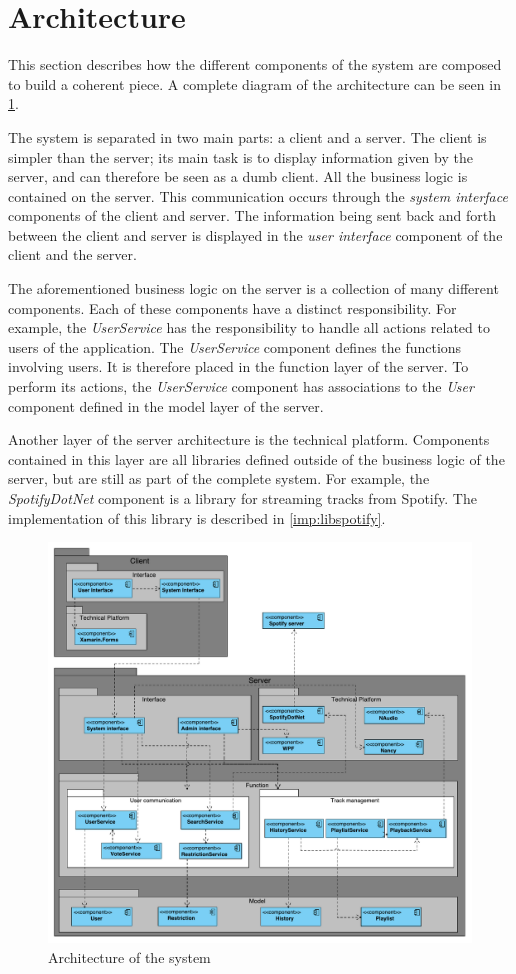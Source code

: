 \section{Architecture}
\label{sec:architecture}

This section describes how the different components of the system are
composed to build a coherent piece. A complete diagram of the
architecture can be seen in \cref{fig:architecture}.

The system is separated in two main parts: a client and a server. The
client is simpler than the server; its main task is to display
information given by the server, and can therefore be seen as a dumb
client. All the business logic is contained on the
server. This communication occurs through the \textit{system interface}
components of the client and server. The information being sent back and
forth between the client and server is displayed in the \textit{user interface}
component of the client and the server.

The aforementioned business logic on the server is a collection of
many different components. Each of these components have a distinct
responsibility. For example, the \textit{UserService} has the responsibility to
handle all actions related to users of the application. The
\textit{UserService} component defines the functions involving users. It is
therefore placed in the function layer of the server. To perform its
actions, the \textit{UserService} component has associations to the \textit{User}
component defined in the model layer of the server.

Another layer of the server architecture is the
technical platform. Components contained in this layer are all
libraries defined outside of the business logic of the server, but are
still as part of the complete system. For example, the
\textit{SpotifyDotNet} component is a library for streaming tracks from
Spotify. The implementation of this library is described in
\cref{imp:libspotify}.

\begin{figure}[H]
  \centering
  \includegraphics[width=1.2\linewidth]{Images/Arkitektur.pdf}
  \caption{Architecture of the system}\label{fig:architecture}
\end{figure}
